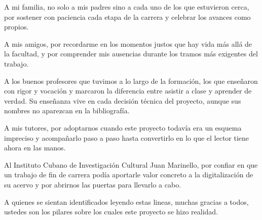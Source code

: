 \begin{acknowledgements}
	A mi familia, no solo a mis padres sino a cada uno de los que estuvieron cerca, por sostener con paciencia cada etapa de la carrera y celebrar los avances como propios.
	
	A mis amigos, por recordarme en los momentos justos que hay vida más allá de la facultad, y por comprender mis ausencias durante los tramos más exigentes del trabajo.
	
	A los buenos profesores que tuvimos a lo largo de la formación, los que enseñaron con rigor y vocación y marcaron la diferencia entre asistir a clase y aprender de verdad. Su enseñanza vive en cada decisión técnica del proyecto, aunque sus nombres no aparezcan en la bibliografía.
	
	A mis tutores, por adoptarnos cuando este proyecto todavía era un esquema impreciso y acompañarlo paso a paso hasta convertirlo en lo que el lector tiene ahora en las manos.
	
	Al Instituto Cubano de Investigación Cultural Juan Marinello, por confiar en que un trabajo de fin de carrera podía aportarle valor concreto a la digitalización de su acervo y por abrirnos las puertas para llevarlo a cabo.
	
	A quienes se sientan identificados leyendo estas lineas, muchas gracias a todos, ustedes son los pilares sobre los cuales este proyecto se hizo realidad.
	
\end{acknowledgements}